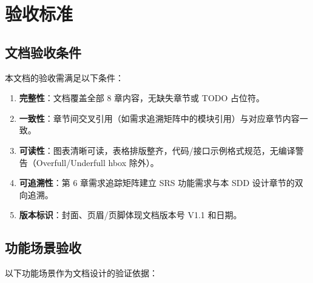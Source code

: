 \section{验收标准}

\subsection{文档验收条件}

本文档的验收需满足以下条件：

\begin{enumerate}[itemsep=0pt]
  \item \textbf{完整性}：文档覆盖全部 8 章内容，无缺失章节或 TODO 占位符。
  \item \textbf{一致性}：章节间交叉引用（如需求追溯矩阵中的模块引用）与对应章节内容一致。
  \item \textbf{可读性}：图表清晰可读，表格排版整齐，代码/接口示例格式规范，无编译警告（Overfull/Underfull hbox 除外）。
  \item \textbf{可追溯性}：第 6 章需求追踪矩阵建立 SRS 功能需求与本 SDD 设计章节的双向追溯。
  \item \textbf{版本标识}：封面、页眉/页脚体现文档版本号 V1.1 和日期。
\end{enumerate}

\subsection{功能场景验收}

以下功能场景作为文档设计的验证依据：

